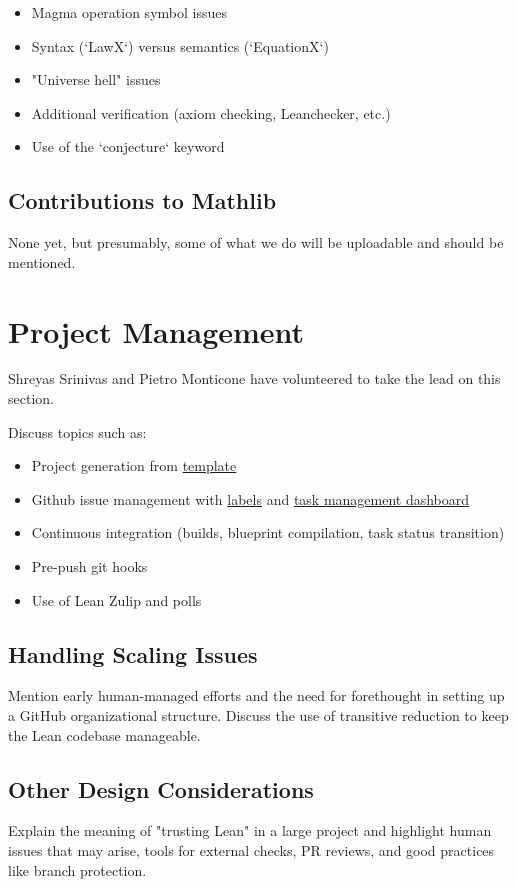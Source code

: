 \documentclass[12pt]{article}
\theoremstyle{definition}
\begin{document}
\begin{itemize}
    \item Magma operation symbol issues
    \item Syntax (`LawX`) versus semantics (`EquationX`)
    \item "Universe hell" issues
    \item Additional verification (axiom checking, Leanchecker, etc.)
    \item Use of the `conjecture` keyword
\end{itemize}

\subsection{Contributions to Mathlib}
None yet, but presumably, some of what we do will be uploadable and should be mentioned.

\section{Project Management}
Shreyas Srinivas and Pietro Monticone have volunteered to take the lead on this section.

Discuss topics such as:
\begin{itemize}
    \item Project generation from \href{https://github.com/pitmonticone/LeanProject}{template}
    \item Github issue management with \href{https://github.com/teorth/equational_theories/labels}{labels} and \href{https://github.com/users/teorth/projects/1}{task management dashboard}
    \item Continuous integration (builds, blueprint compilation, task status transition)
    \item Pre-push git hooks
    \item Use of Lean Zulip and polls
\end{itemize}

\subsection{Handling Scaling Issues}
Mention early human-managed efforts and the need for forethought in setting up a GitHub organizational structure. Discuss the use of transitive reduction to keep the Lean codebase manageable.

\subsection{Other Design Considerations}
Explain the meaning of "trusting Lean" in a large project and highlight human issues that may arise, tools for external checks, PR reviews, and good practices like branch protection.
\end{document}
